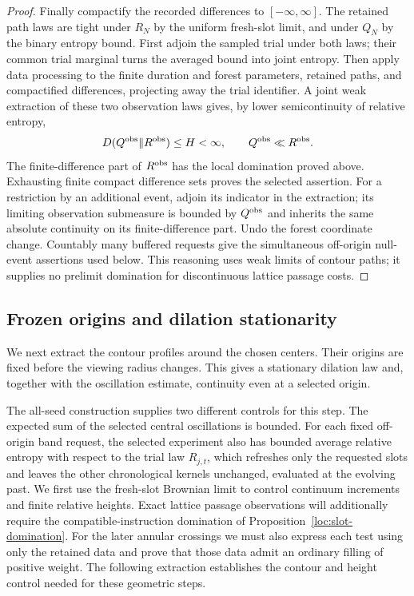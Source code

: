 \begin{proof}
Finally compactify the recorded differences to $[-\infty,\infty]$.
The retained path laws are tight under $R_N$ by the uniform fresh-slot
limit, and under $Q_N$ by the binary entropy bound.  First adjoin the
sampled trial under both laws; their common trial marginal turns the
averaged bound into joint entropy.  Then apply data processing to the
finite duration and forest parameters, retained paths, and compactified
differences, projecting away the trial identifier.  A joint weak
extraction of these two observation laws gives, by lower semicontinuity
of relative entropy,
\[
 D(Q^{\rm obs}\Vert R^{\rm obs})\le H<\infty,
 \qquad Q^{\rm obs}\ll R^{\rm obs}.
\]
The finite-difference part of $R^{\rm obs}$ has the local domination
proved above.  Exhausting finite compact difference sets proves the
selected assertion.  For a restriction by an additional event, adjoin
its indicator in the extraction; its limiting observation submeasure
is bounded by $Q^{\rm obs}$ and inherits the same absolute continuity
on its finite-difference part.  Undo the forest coordinate change.
Countably many buffered requests give the simultaneous off-origin
null-event assertions used below.  This reasoning uses weak limits of
contour paths; it supplies no prelimit domination for discontinuous
lattice passage costs.
\end{proof}

\subsection{Frozen origins and dilation stationarity}

We next extract the contour profiles around the chosen centers.  Their
origins are fixed before the viewing radius changes.  This gives a
stationary dilation law and, together with the oscillation estimate,
continuity even at a selected origin.

The all-seed construction supplies two different controls for this step.
The expected sum of the selected central oscillations is bounded.  For
each fixed off-origin band request, the selected experiment also has
bounded average relative entropy with respect to the trial law
$R_{j,t}$, which refreshes only the requested slots and leaves the other
chronological kernels unchanged, evaluated at the evolving past.
We first use the fresh-slot Brownian limit to control continuum
increments and finite relative heights.  Exact lattice passage
observations will additionally require the compatible-instruction
domination of Proposition~\ref{loc:slot-domination}.  For the later
annular crossings we must also express each test using only the retained
data and prove that those data admit an ordinary filling of positive
weight.  The following extraction establishes the contour and height
control needed for these geometric steps.

